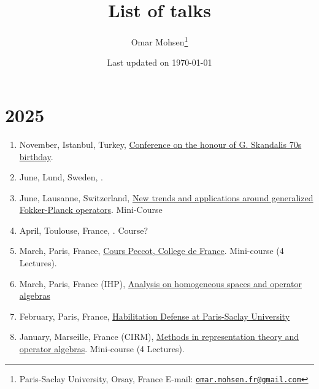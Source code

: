 \documentclass[a4paper, 13pt]{article}
\begin{document}
\title{List of talks}
\author{Omar Mohsen\thanks{
Paris-Saclay University, Orsay, France
\vskip-2pt E-mail: \href{mailto:omar.mohsen.fr@gmail.com}{\texttt{omar.mohsen.fr@gmail.com}}}}
\date{Last updated on \today}
\maketitle
\section*{2025}
  \begin{enumerate}
    \item November, Istanbul, Turkey, \href{}{Conference on the honour of G. Skandalis 70s birthday}.
    \item June, Lund, Sweden, \href{}{}.
    \item June, Lausanne, Switzerland, \href{https://bernoulli.epfl.ch/programs/new-trends-and-applications-around-generalized-fokker-planck-operators/}{New trends and applications around generalized Fokker-Planck operators}. Mini-Course 
    \item April, Toulouse, France, \href{}{}. Course?
    \item March, Paris, France, \href{https://www.college-de-france.fr/fr/agenda/conferencier-invite/on-maximal-hypoellipticity-and-sub-riemannian-geometry}{Cours Peccot, College de France}. Mini-course (4 Lectures).
    \item March, Paris, France (IHP), \href{https://indico.math.cnrs.fr/event/10858/}{Analysis on homogeneous spaces and operator algebras}
    \item February, Paris, France, \href{}{Habilitation Defense at Paris-Saclay University}
    \item January,  Marseille, France (CIRM), \href{https://conferences.cirm-math.fr/3227.html}{Methods in representation theory and operator algebras}. Mini-course (4 Lectures).
  \end{enumerate}
\end{document}
